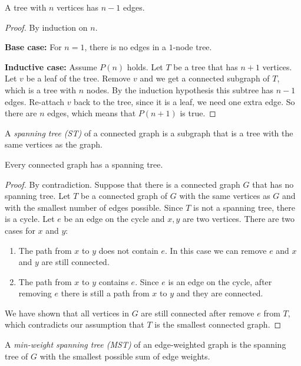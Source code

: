 \documentclass[11pt]{article}
\begin{document}
\begin{lemma}
A tree with $n$ vertices has $n-1$ edges.
\end{lemma}

\begin{proof}
By induction on $n$.

\textbf{Base case:} For $n=1$, there is no edges in a $1$-node tree.

\textbf{Inductive case:} Assume $P(n)$ holds. Let $T$ be a tree that has $n+1$ vertices. Let $v$ be a
leaf of the tree. Remove $v$ and we get a connected subgraph of $T$, which is a tree with $n$ nodes.
By the induction hypothesis this subtree has $n-1$ edges. Re-attach $v$ back to the tree, since it is
a leaf, we need one extra edge. So there are $n$ edges, which means that $P(n+1)$ is true.
\end{proof}

\begin{definition}
A \emph{spanning tree (ST)} of a connected graph is a subgraph that is a tree with the same vertices
as the graph.
\end{definition}

\begin{theorem}
Every connected graph has a spanning tree.
\end{theorem}

\begin{proof}
By contradiction. Suppose that there is a connected graph $G$ that has no spanning tree. Let $T$ be
a connected graph of $G$ with the same vertices as $G$ and with the smallest number of edges
possible. Since $T$ is not a spanning tree, there is a cycle. Let $e$ be an edge on the cycle and
$x,y$ are two vertices. There are two cases for $x$ and $y$:
\begin{enumerate}
\item The path from $x$ to $y$ does not contain $e$. In this case we can remove $e$ and $x$ and $y$
are still connected.
\item The path from $x$ to $y$ contains $e$. Since $e$ is an edge on the cycle, after removing $e$
there is still a path from $x$ to $y$ and they are connected.
\end{enumerate}
We have shown that all vertices in $G$ are still connected after remove $e$ from $T$, which
contradicts our assumption that $T$ is the smallest connected graph.
\end{proof}

\begin{definition}
A \emph{min-weight spanning tree (MST)} of an edge-weighted graph is the spanning tree of $G$ with
the smallest possible sum of edge weights.
\end{definition}
\end{document}
